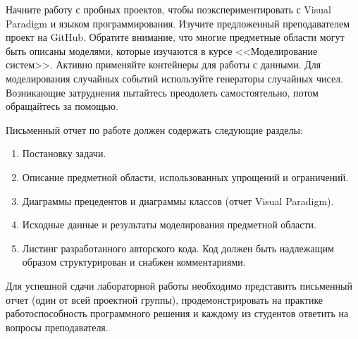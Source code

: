 Начните работу с пробных проектов, чтобы поэкспериментировать с Visual Paradigm и языком программирования.
Изучите предложенный преподавателем проект на GitHub.
Обратите внимание, что многие предметные области могут быть описаны моделями, которые изучаются в курсе <<Моделирование систем>>. 
Активно применяйте контейнеры для работы с данными. 
Для моделирования случайных событий используйте генераторы случайных чисел. 
Возникающие затруднения пытайтесь преодолеть самостоятельно, потом обращайтесь за помощью. 

Письменный отчет по работе должен содержать следующие разделы: 
\begin{enumerate}
\item Постановку задачи. 

\item Описание предметной области, использованных упрощений и ограничений. 

\item Диаграммы прецедентов и диаграммы классов (отчет Visual Paradigm). 

\item Исходные данные и результаты моделирования предметной области. 

\item Листинг разработанного авторского кода. Код должен быть надлежащим образом структурирован и снабжен комментариями. 
\end{enumerate}

Для успешной сдачи лабораторной работы необходимо представить письменный отчет (один от всей проектной группы), продемонстрировать на практике работоспособность программного решения и каждому из студентов ответить на вопросы преподавателя.
